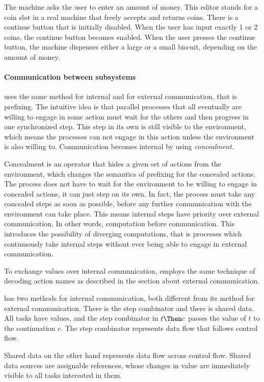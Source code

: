The machine asks the user to enter an amount of money.
This editor stands for a coin slot in a real machine that freely accepts and returns coins.
There is a continue button that is initially disabled.
When the user has input exactly 1 or 2 coins, the continue button becomes enabled.
When the user presses the continue button, the machine dispenses either a large or a small biscuit, depending on the amount of money.


\paragraph{Communication between subsystems}

\CSP uses the same method for internal and for external communication, that is prefixing.
The intuitive idea is that parallel processes that all eventually are willing to engage in some action must wait for the others and then progress in one synchronized step.
This step in its own is still visible to the environment, which means the processes can not engage in this action unless the environment is also willing to.
Communication becomes internal by using \emph{concealment}.

Concealment is an operator that hides a given set of actions from the environment, which changes the semantics of prefixing for the concealed actions.
The process does not have to wait for the environment to be willing to engage in concealed actions, it can just step on its own.
In fact, the process must take any concealed steps as soon as possible, before any further communication with the environment can take place.
This means internal steps have priority over external communication.
In other words, computation before communication.
This introduces the possibility of diverging computations, that is processes which continuously take internal steps without ever being able to engage in external communication.

To exchange values over internal communication, \CSP employs the same technique of decoding action names as described in the section about external communication.

\TOP has two methods for internal communication, both different from its method for external communication.
There is the step combinator and there is shared data.
All tasks have values, and the step combinator in $t \Then c$ passes the value of $t$ to the continuation $c$.
The step combinator represents data flow that follows control flow.

Shared data on the other hand represents data flow across control flow.
Shared data sources are assignable references, whose changes in value are immediately visible to all tasks interested in them.

